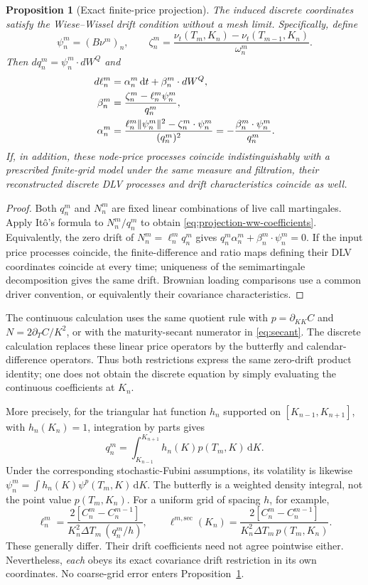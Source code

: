 \documentclass[11pt,a4paper]{article}
\numberwithin{equation}{section}
\newtheorem{proposition}[theorem]{Proposition}
\theoremstyle{definition}\newtheorem{definition}[theorem]{Definition}
\theoremstyle{remark}\newtheorem{remark}[theorem]{Remark}
\newcommand{\dd}{\,\mathrm d}\newcommand{\dt}{\,\mathrm dt}
\begin{document}
\begin{proposition}[Exact finite-price projection]
\label{prop:smooth-projection-ww}
The induced discrete coordinates satisfy the Wiese--Wissel drift condition without a mesh limit. Specifically, define
\[
 \psi_n^m=(B\nu^m)_n,\qquad
 \zeta_n^m=\frac{\nu_t(T_m,K_n)-\nu_t(T_{m-1},K_n)}{\omega_n^m}.
\]
Then $dq_n^m=\psi_n^m\cdot dW^Q$ and
\begin{align}
 d\ell_n^m&=\alpha_n^m\dt+\beta_n^m\cdot dW^Q,\notag\\
 \beta_n^m&=\frac{\zeta_n^m-\ell_n^m\psi_n^m}{q_n^m},\notag\\
 \alpha_n^m&=\frac{\ell_n^m\|\psi_n^m\|^2-\zeta_n^m\cdot\psi_n^m}{(q_n^m)^2}
            =-\frac{\beta_n^m\cdot\psi_n^m}{q_n^m}.
 \label{eq:projection-ww-coefficients}
\end{align}
If, in addition, these node-price processes coincide indistinguishably with a prescribed finite-grid model under the same measure and filtration, their reconstructed discrete DLV processes and drift characteristics coincide as well.
\end{proposition}
\begin{proof}
Both $q_n^m$ and $N_n^m$ are fixed linear combinations of live call martingales. Apply It\^o's formula to $N_n^m/q_n^m$ to obtain \eqref{eq:projection-ww-coefficients}. Equivalently, the zero drift of $N_n^m=\ell_n^m q_n^m$ gives $q_n^m\alpha_n^m+\beta_n^m\cdot\psi_n^m=0$. If the input price processes coincide, the finite-difference and ratio maps defining their DLV coordinates coincide at every time; uniqueness of the semimartingale decomposition gives the same drift. Brownian loading comparisons use a common driver convention, or equivalently their covariance characteristics.
\end{proof}

The continuous calculation uses the same quotient rule with
$p=\partial_{KK}C$ and $N=2\partial_TC/K^2$, or with the maturity-secant numerator in \eqref{eq:secant}. The discrete calculation replaces these linear price operators by the butterfly and calendar-difference operators. Thus both restrictions express the same zero-drift product identity; one does not obtain the discrete equation by simply evaluating the continuous coefficients at $K_n$.

More precisely, for the triangular hat function $h_n$ supported on $[K_{n-1},K_{n+1}]$, with $h_n(K_n)=1$, integration by parts gives
\begin{equation}
 q_n^m=\int_{K_{n-1}}^{K_{n+1}}h_n(K)p(T_m,K)\dd K.
 \label{eq:hat-density}
\end{equation}
Under the corresponding stochastic-Fubini assumptions, its volatility is likewise
$\psi_n^m=\int h_n(K)\psi^p(T_m,K)\dd K$. The butterfly is a weighted density integral, not the point value $p(T_m,K_n)$. For a uniform grid of spacing $h$, for example,
\[
 \ell_n^m=
 \frac{2[C_n^m-C_n^{m-1}]}{K_n^2\Delta T_m\,(q_n^m/h)},
 \qquad
 \ell^{m,\mathrm{sec}}(K_n)=
 \frac{2[C_n^m-C_n^{m-1}]}{K_n^2\Delta T_m\,p(T_m,K_n)}.
\]
These generally differ. Their drift coefficients need not agree pointwise either. Nevertheless, \emph{each} obeys its exact covariance drift restriction in its own coordinates. No coarse-grid error enters Proposition~\ref{prop:smooth-projection-ww}.
\end{document}
